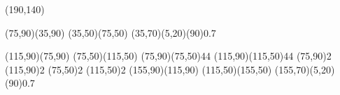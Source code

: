 \documentclass{standalone}
\begin{document}
\begin{axopicture}(190,140)

  \Line[arrow](75,90)(35,90)      %
  \Line[arrow](35,50)(75,50)      %
  \GOval(35,70)(5,20)(90){0.7}    %
                                  
  \Line[arrow](115,90)(75,90)     %
  \Line[arrow](75,50)(115,50)     %
  \Photon(75,90)(75,50){4}{4}     %
  \Photon(115,90)(115,50){4}{4}   %
  \Vertex(75,90){2}               %
  \Vertex(115,90){2}              %
  \Vertex(75,50){2}               %
  \Vertex(115,50){2}              %
  \Line[arrow](155,90)(115,90)    %
  \Line[arrow](115,50)(155,50)    %
  \GOval(155,70)(5,20)(90){0.7}   %
                                  
\end{axopicture}
\end{document}
